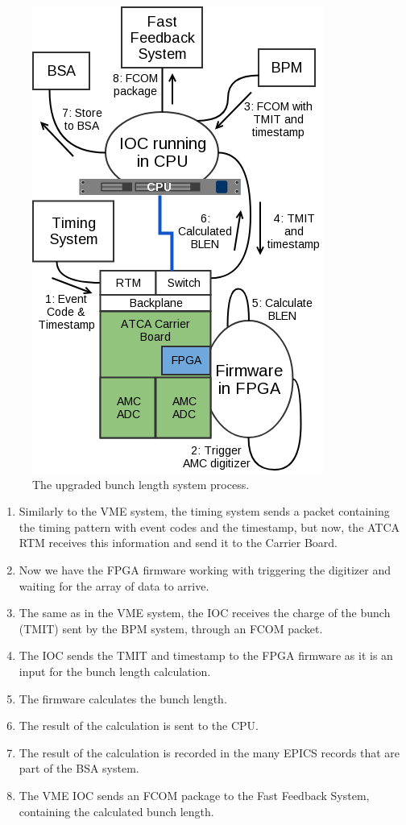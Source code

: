 \documentclass[letter,
        biblatex,   %
        keeplastbox,  %
        ]{jacow}
\begin{document}
\begin{figure}[!htb]
  \centering
  \includegraphics*[width=.8\columnwidth]{BLEN_ATCA_Process}
  \caption{The upgraded bunch length system process.}
  \label{fig:blen_atca}
\end{figure}

\begin{enumerate}
  \item Similarly to the VME system, the timing system sends a packet containing the timing pattern with event codes and the timestamp, but now, the ATCA RTM receives this information and send it to the Carrier Board.
  \item Now we have the FPGA firmware working with triggering the digitizer and waiting for the array of data to arrive.
  \item The same as in the VME system, the IOC receives the charge of the bunch (TMIT) sent by the BPM system, through an FCOM packet.
  \item The IOC sends the TMIT and timestamp to the FPGA firmware as it is an input for the bunch length calculation.
  \item The firmware calculates the bunch length.
  \item The result of the calculation is sent to the CPU.
  \item The result of the calculation is recorded in the many EPICS records that are part of the BSA system.
  \item The VME IOC sends an FCOM package to the Fast Feedback System, containing the calculated bunch length.
\end{enumerate}
\end{document}
